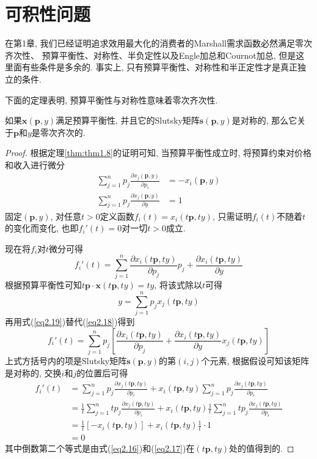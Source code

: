\documentclass[cn, 12pt, math=mtpro2, bibstyle=apa, blue]{elegantbook}
\newcommand{\p}{\mathbf{p}}
\newcommand{\x}{\mathbf{x}}
\begin{document}
\section{可积性问题}
在第1章, 我们已经证明追求效用最大化的消费者的Marshall需求函数必然满足零次齐次性、 预算平衡性、对称性、半负定性以及Engle加总和Cournot加总, 但是这里面有些条件是多余的. 事实上, 只有预算平衡性、对称性和半正定性才是真正独立的条件.

下面的定理表明, 预算平衡性与对称性意味着零次齐次性.
\begin{theorem}
  如果$\x(\p,y)$满足预算平衡性, 并且它的Slutsky矩阵$\mathbf{s}(\p,y)$是对称的, 那么它关于$\p$和$y$是零次齐次的.
\end{theorem}
\begin{proof}
  根据定理\ref{thm:thm1.8}的证明可知, 当预算平衡性成立时, 将预算约束对价格和收入进行微分
  \begin{align}
  \sum_{j=1}^{n}p_j\frac{\partial x_j(\p,y)}{\partial p_i}&=-x_i(\p,y) \label{eq2.16} \\
  \sum_{j=1}^{n}p_j\frac{\partial x_j(\p,y)}{\partial y}&=1 \label{eq2.17}
  \end{align}
  固定$(\p,y)$, 对任意$t>0$定义函数$f_i(t)=x_i(t\p,ty)$, 只需证明$f_i(t)$不随着$t$的变化而变化, 也即$f_i'(t)=0$对一切$t>0$成立.

  现在将$f_i$对$t$微分可得
  \begin{equation}\label{eq2.18}
    f_i'(t)=\sum_{j=1}^{n}\frac{\partial x_i(t\p,ty)}{\partial p_j}p_j+\frac{\partial x_i(t\p,ty)}{\partial y}
  \end{equation}
  根据预算平衡性可知$t\p\cdot\x(t\p,ty)=ty$, 将该式除以$t$可得
  \begin{equation}\label{eq2.19}
    y=\sum_{j=1}^{n}p_jx_j(t\p,ty)
  \end{equation}
  再用式(\ref{eq2.19})替代(\ref{eq2.18})得到
  $$f_i'(t)=\sum_{j=1}^{n}p_j\left[\frac{\partial x_i(t\p,ty)}{\partial p_j}+\frac{\partial x_i(t\p,ty)}{\partial y}x_j(t\p,ty)\right]$$
  上式方括号内的项是Slutsky矩阵$\mathbf{s}(\p,y)$的第$(i,j)$个元素, 根据假设可知该矩阵是对称的, 交换$i$和$j$的位置后可得
  \begin{align*}
  f_i'(t)&=\sum_{j=1}^{n}p_j\frac{\partial x_j(t\p,ty)}{\partial p_i}+x_i(t\p,ty)\sum_{j=1}^{n}p_j\frac{\partial x_j(t\p,ty)}{\partial p_i} \\
  &=\frac{1}{t}\sum_{j=1}^{n}tp_j\frac{\partial x_j(t\p,ty)}{\partial p_i}+x_i(t\p,ty)\frac{1}{t}\sum_{j=1}^{n}tp_j\frac{\partial x_j(t\p,ty)}{\partial p_i} \\
  &=\frac{1}{t}[-x_i(t\p,ty)]+x_i(t\p,ty)\frac{1}{t}\cdot1\\
  &=0
  \end{align*}
  其中倒数第二个等式是由式(\ref{eq2.16})和(\ref{eq2.17})在$(t\p,ty)$处的值得到的.
\end{proof}
\end{document}
